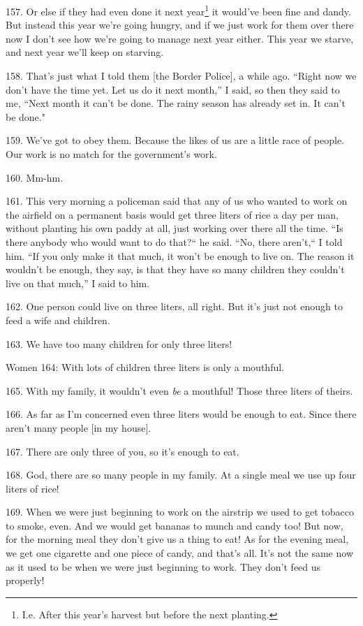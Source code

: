 157. Or else if they had even done it next year\footnote{I.e. After this year's harvest but before the next planting.} it would've been fine and dandy.
But instead this year we're going hungry, and if we just work for them over there
now I don't see how we're going to manage next year either. This year we starve,
and next year we'll keep on starving.

158. That's just what I told them [the Border Police], a while ago. ``Right
now we don't have the time yet. Let us do it next month,'' I said, so then
they said to me, ``Next month it can't be done. The rainy season has already set
in. It can't be done."

159. We've got to obey them. Because the likes of us are a little race of people.
Our work is no match for the government's work.

160. Mm-hm.

161. This very morning a policeman said that any of us who wanted to work on the
airfield on a permanent basis would get three liters of rice a day per man, without
planting his own paddy at all, just working over there all the time. ``Is
there anybody who would want to do that?`` he said. ``No, there
aren't,`` I told him. ``If you only make it that much, it won't
be enough to live on. The reason it wouldn't be enough, they say, is that they
have so many children they couldn't live on that much,'' I said to him.

162. One person could live on three liters, all right. But it's just not enough
to feed a wife and children.

163. We have too many children for only three liters!

Women 164: With lots of children three liters is only a mouthful.

165. With my family, it wouldn't even \textit{be} a mouthful! Those three liters
of theirs.

166. As far as I'm concerned even three liters would be enough to eat. Since there
aren't many people [in my house].

167. There are only three of you, so it's enough to eat.

168. God, there are so many people in my family. At a single meal we use up four
liters of rice!

169. When we were just beginning to work on the airstrip we used to get tobacco
to smoke, even. And we would get bananas to munch and candy too! But now, for the
morning meal they don't give us a thing to eat! As for the evening meal, we get
one cigarette and one piece of candy, and that's all. It's not the same now as
it used to be when we were just beginning to work. They don't feed us properly!

